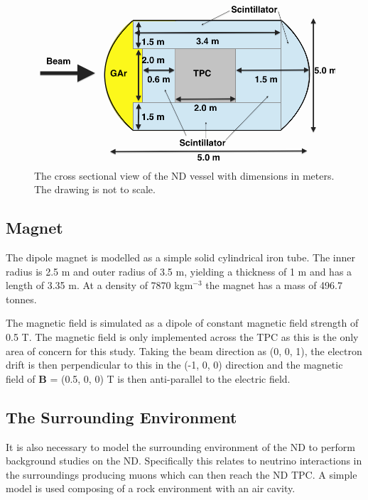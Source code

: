 \begin{figure}[hbtp]
\begin{center}
  \includegraphics[width=120mm]{Chapter4/figures/vesselDiagram.png}
  \caption{The cross sectional view of the ND vessel with dimensions in meters. The drawing is not to scale.}
  \label{fig:vesselDiagram}
\end{center}
\end{figure}

\subsection{Magnet}
The dipole magnet is modelled as a simple solid cylindrical iron tube. The inner radius is 2.5 m and outer radius of 3.5 m, yielding a thickness of 1 m and has a length of 3.35 m. At a density of 7870 kgm$^{-3}$ the magnet has a mass of 496.7 tonnes. 

The magnetic field is simulated as a dipole of constant magnetic field strength of 0.5 T. The magnetic field is only implemented across the TPC as this is the only area of concern for this study. Taking the beam direction as (0, 0, 1), the electron drift is then perpendicular to this in the (-1, 0, 0) direction and the magnetic field of $\boldsymbol{B}$ = (0.5, 0, 0) T is then anti-parallel to the electric field.

\subsection{The Surrounding Environment}
It is also necessary to model the surrounding environment of the ND to perform background studies on the ND. Specifically this relates to neutrino interactions in the surroundings producing muons which can then reach the ND TPC. A simple model is used composing of a rock environment with an air cavity.

